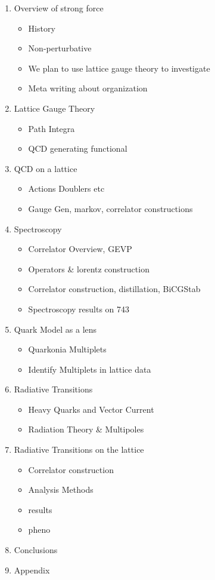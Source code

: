 
{\color{red}

\begin{enumerate}
\item Overview of strong force
	\begin{itemize}
		\item History
		\item Non-perturbative
		\item We plan to use lattice gauge theory to investigate
		\item Meta writing about organization
	\end{itemize}
	
\item Lattice Gauge Theory
	\begin{itemize}
		\item Path Integra
		\item QCD generating functional 
	\end{itemize}
	
\item QCD on a lattice
	\begin{itemize}
		\item Actions Doublers etc
		\item Gauge Gen, markov, correlator constructions 
	\end{itemize}
	
\item Spectroscopy
	\begin{itemize}
		\item Correlator Overview, GEVP
		\item Operators \& lorentz construction 
		\item Correlator construction, distillation, BiCGStab
		\item Spectroscopy results on 743 
	\end{itemize}	
	
\item Quark Model as a lens 
	\begin{itemize}
		\item Quarkonia Multiplets
		\item Identify Multiplets in lattice data
	\end{itemize}	

\item Radiative Transitions
	\begin{itemize}
		\item Heavy Quarks and Vector Current
		\item Radiation Theory \& Multipoles
	\end{itemize}	

\item Radiative Transitions on the lattice 
	\begin{itemize}
		\item Correlator construction
		\item Analysis Methods 
		\item results
		\item pheno 
	\end{itemize}	

\item Conclusions 

\item Appendix 

\end{enumerate}


} %
